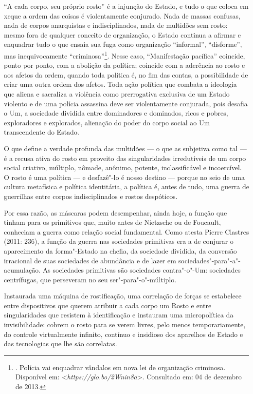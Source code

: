 ``A cada corpo, seu próprio rosto'' é a injunção do Estado, e tudo o que
coloca em xeque a ordem das coisas é violentamente conjurado. Nada de
massas confusas, nada de corpos anarquistas e indisciplinados, nada de
multidões sem rosto: mesmo fora de qualquer conceito de
organização, o Estado continua a afirmar e enquadrar tudo
o que ensaia sua fuga como organização ``informal'', ``disforme'', mas
inequivocamente ``criminosa''\footnote{. Polícia vai
  enquadrar vândalos em nova lei de organização criminosa. Disponível
  em:
  \textless{}\emph{https://glo.bo/2Wnin8a}\textgreater{}.
  Consultado em: 04 de dezembro de 2013.}. Nesse caso, ``Manifestação pacífica''
coincide, ponto por ponto, com a abolição da política; coincide com a
aderência ao rosto e aos afetos da ordem, quando toda política é, no fim
das contas, a possibilidade de criar uma outra ordem dos afetos. Toda
ação política que combata a ideologia que aliena e sacraliza a violência
como prerrogativa exclusiva de um Estado violento e de uma polícia
assassina deve ser violentamente conjurada, pois desafia o Um, a
sociedade dividida entre dominadores e dominados, ricos e pobres,
exploradores e explorados, alienação do poder do corpo social ao Um
transcendente do Estado.

O que define a verdade profunda das multidões --- o que as subjetiva como
tal --- é a recusa ativa do rosto em proveito das singularidades
irredutíveis de um corpo social criativo, múltiplo, nômade, anônimo,
potente, inclassificável e incoercível. O rosto é uma política --- e
desfazê"-lo é nosso destino --- porque no seio de uma cultura metafísica e
política identitária, a política é, antes de tudo, uma guerra de
guerrilhas entre corpos indisciplinados e rostos despóticos.

Por essa razão, as máscaras podem desempenhar, ainda hoje, a função que
tinham para os primitivos que, muito antes de Nietzsche ou de Foucault,
conheciam a guerra como relação social fundamental. Como atesta Pierre
Clastres (2011: 236), a função da guerra nas sociedades primitivas era
a de conjurar o aparecimento da forma"-Estado na chefia, da sociedade
dividida, da conversão irracional de suas sociedades de abundância e de
lazer em sociedades"-para"-a"-acumulação. As sociedades primitivas são
sociedades contra"-o"-Um: sociedades centrífugas, que perseveram no seu
ser"-para"-o"-múltiplo.

Instaurada uma máquina de rostificação, uma correlação de forças se
estabelece entre dispositivos que querem atribuir a cada corpo um Rosto
e entre singularidades que resistem à identificação e instauram uma
micropolítica da invisibilidade: cobrem o rosto para se verem livres,
pelo menos temporariamente, do controle virtualmente infinito, contínuo
e insidioso dos aparelhos de Estado e das tecnologias que lhe são
correlatas.

